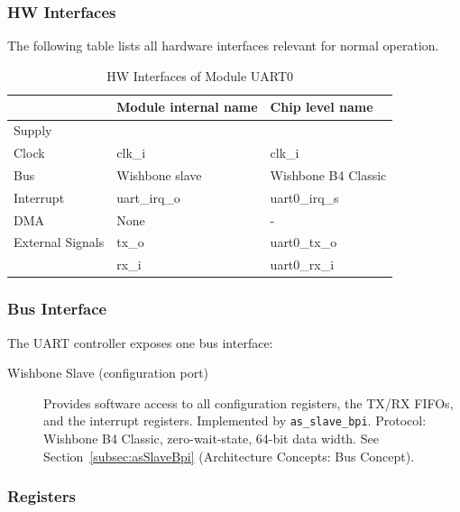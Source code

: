 \subsubsection{HW Interfaces}
The following table lists all hardware interfaces relevant for normal operation.

\begin{table}[H]
\caption{HW Interfaces of Module UART0}
\label{tab:asUartPer02}
\centering
\begin{tabularx}{\textwidth}{|l |l |X|}
  \hline
   & Module internal name & Chip level name \\
  \hline
  \hline
  Supply &  &  \\
  \hline
  Clock & clk\_i & clk\_i \\
  \hline
  Bus & Wishbone slave & Wishbone B4 Classic \\
  \hline
  Interrupt & uart\_irq\_o & uart0\_irq\_s \\
  \hline
  DMA & None & - \\
  \hline
  External Signals & tx\_o & uart0\_tx\_o \\
                   & rx\_i & uart0\_rx\_i \\
  \hline
\end{tabularx}
\end{table}

\subsubsection{Bus Interface}
The UART controller exposes one bus interface:

\begin{description}
  \item[Wishbone Slave (configuration port)] Provides software access to all
    configuration registers, the TX/RX FIFOs, and the interrupt registers.
    Implemented by \texttt{as\_slave\_bpi}.
    Protocol: Wishbone B4 Classic, zero-wait-state, 64-bit data width.
    See Section~\ref{subsec:asSlaveBpi} (Architecture Concepts: Bus Concept).
\end{description}

\subsubsection{Registers}

